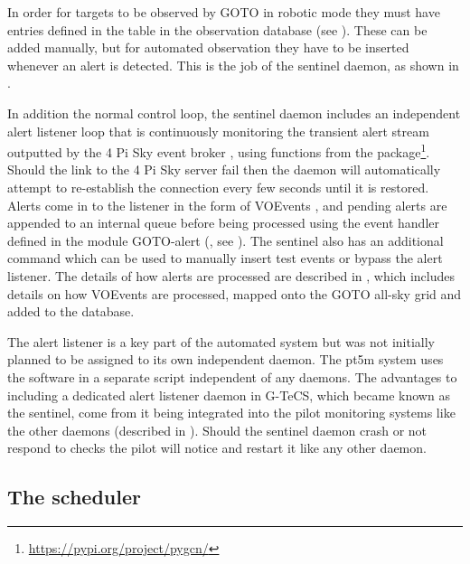 \begin{colsection}
\begin{colsection}
In order for targets to be observed by GOTO in robotic mode they must have entries defined in the  table in the observation database (see ). These can be added manually, but for automated observation they have to be inserted whenever an alert is detected. This is the job of the sentinel daemon, as shown in .

In addition the normal control loop, the sentinel daemon includes an independent alert listener loop that is continuously monitoring the transient alert stream outputted by the 4 Pi Sky event broker \citep{4pisky}, using functions from the   package\footnote{\url{https://pypi.org/project/pygcn/}}. Should the link to the 4 Pi Sky server fail then the daemon will automatically attempt to re-establish the connection every few seconds until it is restored. Alerts come in to the listener in the form of VOEvents \citep{voevent}, and pending alerts are appended to an internal queue before being processed using the event handler defined in the  module GOTO-alert (, see ). The sentinel also has an additional  command which can be used to manually insert test events or bypass the alert listener. The details of how alerts are processed are described in , which includes details on how VOEvents are processed, mapped onto the GOTO all-sky grid and added to the database.

The alert listener is a key part of the automated system but was not initially planned to be assigned to its own independent daemon. The \gls{pt5m} system uses the  software \citep{comet} in a separate script independent of any daemons. The advantages to including a dedicated alert listener daemon in G-TeCS, which became known as the sentinel, come from it being integrated into the pilot monitoring systems like the other daemons (described in ). Should the sentinel daemon crash or not respond to checks the pilot will notice and restart it like any other daemon.

\end{colsection}


\subsection{The scheduler}
\label{sec:scheduler}
\begin{colsection}


\end{colsection}
\end{colsection}
